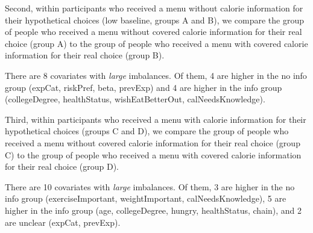 
Second, within participants who received a menu without calorie information for their hypothetical choices (low baseline, groups A and B), we compare the group of people who received a menu without covered calorie information for their real choice (group A) to the group of people who received a menu with covered calorie information for their real choice (group B).

There are 8 covariates with \emph{large} imbalances. Of them, 4 are higher in the no info group (expCat,  riskPref, beta, prevExp) and 4 are higher in the info group (collegeDegree, healthStatus, wishEatBetterOut, calNeedsKnowledge).

Third, within participants who received a menu with calorie information for their hypothetical choices (groups C and D), we compare the group of people who received a menu without covered calorie information for their real choice (group C) to the group of people who received a menu with covered calorie information for their real choice (group D).

There are 10 covariates with \emph{large} imbalances. Of them, 3 are higher in the no info group (exerciseImportant, weightImportant, calNeedsKnowledge), 5 are higher in the info group (age, collegeDegree, hungry, healthStatus, chain), and 2 are unclear (expCat, prevExp).

% 
